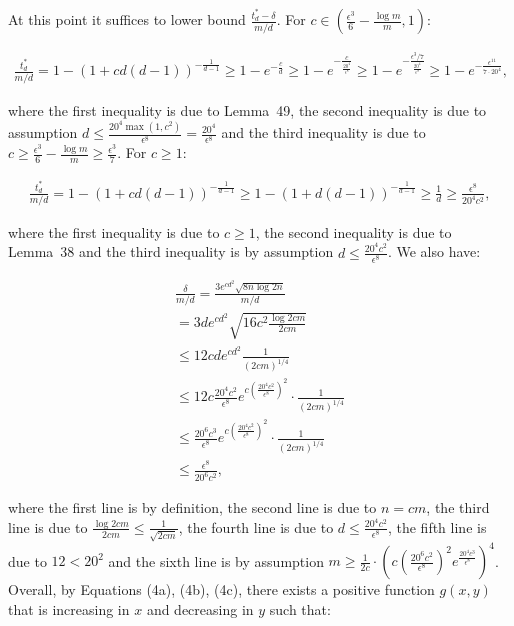 At this point it suffices to lower bound $\frac{t^{*}_{d}-\delta}{m/d}$.
For $c\in\left(\frac{\epsilon^{3}}{6}-\frac{\log{m}}{m},1\right)$:\par


\[\begin{gathered}
\displaystyle\frac{t^{*}_{d}}{m/d}=1-\left(1+cd(d-1)\right)^{-\frac{1}{d-1}}\geq 1-e^{-\frac{c}{d}}\geq 1-e^{-\frac{c}{\frac{20^{4}}{\epsilon^{8}}}}\geq 1-e^{-\frac{\epsilon^{3}/7}{\frac{20^{4}}{\epsilon^{8}}}}\geq 1-e^{-\frac{\epsilon^{11}}{7\cdot 20^{4}}},
\end{gathered}\]


where the first inequality is due to Lemma 49, the second inequality is due to assumption $d\leq\frac{20^{4}\max(1,c^{2})}{\epsilon^{8}}=\frac{20^{4}}{\epsilon^{8}}$ and the third inequality is due to $c\geq\frac{\epsilon^{3}}{6}-\frac{\log{m}}{m}\geq\frac{\epsilon^{3}}{7}$.
For $c\geq 1$:\par


\[\begin{gathered}
\displaystyle\frac{t^{*}_{d}}{m/d}=1-\left(1+cd(d-1)\right)^{-\frac{1}{d-1}}\geq 1-\left(1+d(d-1)\right)^{-\frac{1}{d-1}}\geq\frac{1}{d}\geq\frac{\epsilon^{8}}{20^{4}c^{2}},
\end{gathered}\]


where the first inequality is due to $c\geq 1$, the second inequality is due to Lemma 38 and the third inequality is by assumption $d\leq\frac{20^{4}c^{2}}{\epsilon^{8}}$.
We also have:\par


\[\begin{gathered}
\displaystyle\frac{\delta}{m/d} \displaystyle=\frac{3e^{cd^{2}}\sqrt{8n\log{2n}}}{m/d} \\
\displaystyle=3de^{cd^{2}}\sqrt{16c^{2}\frac{\log{2cm}}{2cm}} \\
\displaystyle\leq 12cde^{cd^{2}}\frac{1}{(2cm)^{1/4}} \\
\displaystyle\leq 12c\frac{20^{4}c^{2}}{\epsilon^{8}}e^{c\left(\frac{20^{4}c^{2}}{\epsilon^{8}}\right)^{2}}\cdot\frac{1}{(2cm)^{1/4}} \\
\displaystyle\leq\frac{20^{6}c^{3}}{\epsilon^{8}}e^{c\left(\frac{20^{4}c^{2}}{\epsilon^{8}}\right)^{2}}\cdot\frac{1}{(2cm)^{1/4}} \\
\displaystyle\leq\frac{\epsilon^{8}}{20^{6}c^{2}},
\end{gathered}\]


where the first line is by definition, the second line is due to $n=cm$, the third line is due to $\frac{\log{2cm}}{2cm}\leq\frac{1}{\sqrt{2cm}}$, the fourth line is due to $d\leq\frac{20^{4}c^{2}}{\epsilon^{8}}$, the fifth line is due to $12<20^{2}$ and the sixth line is by assumption $m\geq\frac{1}{2c}\cdot\left(c\left(\frac{20^{6}c^{2}}{\epsilon^{8}}\right)^{2}e^{\frac{20^{4}c^{3}}{\epsilon^{8}}}\right)^{4}$.
Overall, by Equations (4a), (4b), (4c), there exists a positive function $g(x,y)$ that is increasing in $x$ and decreasing in $y$ such that:\par


